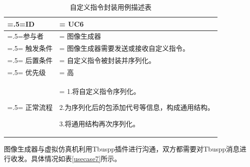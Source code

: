 \begin{table}[htbp]
    \begin{center}
        \caption{自定义指令封装用例描述表}
        \label{usecase6}
        \renewcommand\arraystretch{1.5}
        \begin{tabularx}{0.8\textwidth}{ 
            | >{\centering\arraybackslash\hsize=.5\hsize\linewidth=\hsize}X 
            | >{\raggedright\arraybackslash\hsize=1.5\hsize\linewidth=\hsize}X 
            | }
            \hline
            \textbf{ID} & \textbf{UC6}\\
            \hline
            参与者 & 图像生成器\\
            \hline
            触发条件 & 图像生成器需要发送或接收自定义指令。\\
            \hline
            后置条件 & 自定义指令被封装并序列化。\\
            \hline
            优先级 & 高\\
            \hline
            正常流程 & 
                      1.将自定义指令序列化。\par 2.为序列化后的包添加代号等信息，构成通用结构。\par 3.将通用结构再次序列化。\\
            \hline
        \end{tabularx}
    \end{center}
\end{table}
\par
图像生成器与虚拟仿真机利用Tbuspp插件进行沟通，双方都需要对Tbuspp消息进行收发。具体情况如表\ref{usecase7}所示。
